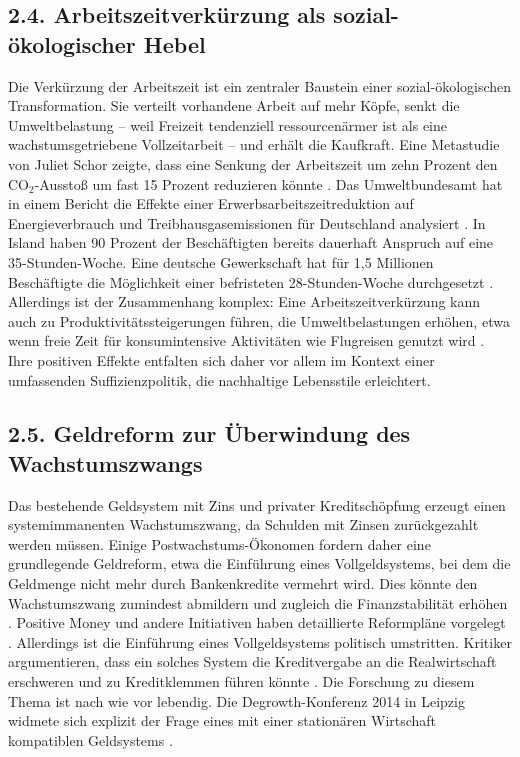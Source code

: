 \documentclass[12pt, a4paper]{article}
\begin{document}
	\subsection*{2.4. Arbeitszeitverkürzung als sozial-ökologischer Hebel}
	Die Verkürzung der Arbeitszeit ist ein zentraler Baustein einer sozial-ökologischen
	Transformation.
	Sie verteilt vorhandene Arbeit auf mehr Köpfe, senkt die
	Umweltbelastung – weil Freizeit tendenziell ressourcenärmer ist als eine
	wachstumsgetriebene Vollzeitarbeit – und erhält die Kaufkraft.
	Eine Metastudie von
	Juliet Schor zeigte, dass eine Senkung der Arbeitszeit um zehn Prozent den CO$_2$-Ausstoß
	um fast 15 Prozent reduzieren könnte \cite{dw2023}.
	Das Umweltbundesamt hat in einem
	Bericht die Effekte einer Erwerbsarbeitszeitreduktion auf Energieverbrauch und
	Treibhausgasemissionen für Deutschland analysiert \cite{uba2019}.
	In Island haben
	90 Prozent der Beschäftigten bereits dauerhaft Anspruch auf eine 35-Stunden-Woche.
	Eine deutsche Gewerkschaft hat für 1,5 Millionen Beschäftigte die Möglichkeit einer
	befristeten 28-Stunden-Woche durchgesetzt \cite{tsri2025}.
	Allerdings ist der
	Zusammenhang komplex: Eine Arbeitszeitverkürzung kann auch zu
	Produktivitätssteigerungen führen, die Umweltbelastungen erhöhen, etwa wenn freie
	Zeit für konsumintensive Aktivitäten wie Flugreisen genutzt wird \cite{monde2021}.
	Ihre positiven Effekte entfalten sich daher vor allem im Kontext einer umfassenden
	Suffizienzpolitik, die nachhaltige Lebensstile erleichtert.
	
	\subsection*{2.5. Geldreform zur Überwindung des Wachstumszwangs}
	Das bestehende Geldsystem mit Zins und privater Kreditschöpfung erzeugt einen
	systemimmanenten Wachstumszwang, da Schulden mit Zinsen zurückgezahlt werden müssen.
	Einige Postwachstums-Ökonomen fordern daher eine grundlegende Geldreform, etwa die
	Einführung eines Vollgeldsystems, bei dem die Geldmenge nicht mehr durch
	Bankenkredite vermehrt wird.
	Dies könnte den Wachstumszwang zumindest abmildern und
	zugleich die Finanzstabilität erhöhen \cite{vollgeld2026}. Positive Money und andere
	Initiativen haben detaillierte Reformpläne vorgelegt \cite{worldfuturecouncil}.
	Allerdings ist die Einführung eines Vollgeldsystems politisch umstritten. Kritiker
	argumentieren, dass ein solches System die Kreditvergabe an die Realwirtschaft
	erschweren und zu Kreditklemmen führen könnte \cite{nzz2014}.
	Die Forschung zu diesem
	Thema ist nach wie vor lebendig. Die Degrowth-Konferenz 2014 in Leipzig widmete sich
	explizit der Frage eines mit einer stationären Wirtschaft kompatiblen Geldsystems
	\cite{degrowth2014}.
	
\end{document}
